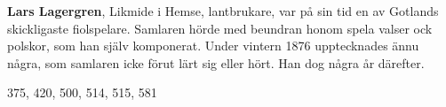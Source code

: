 \textbf{Lars Lagergren}, Likmide i Hemse, lantbrukare, var på sin tid en av
Gotlands skickligaste fiolspelare. Samlaren hörde med beundran honom
spela valser ock polskor, som han själv komponerat. Under vintern 1876
upptecknades ännu några, som samlaren icke förut lärt sig eller hört.
Han dog några år därefter.

375, 420, 500, 514, 515, 581 
